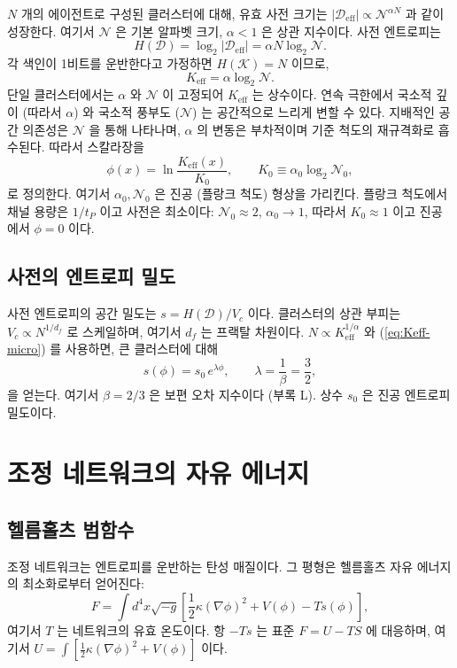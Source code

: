 \documentclass[12pt,a4paper]{article}
\newcommand{\Dir}{\mathcal{D}}
\begin{document}
	\(N\) 개의 에이전트로 구성된 클러스터에 대해, 유효 사전 크기는 \(|\Dir_{\mathrm{eff}}| \propto \mathcal{N}^{\alpha N}\) 과 같이 성장한다. 여기서 \(\mathcal{N}\) 은 기본 알파벳 크기, \(\alpha<1\) 은 상관 지수이다. 사전 엔트로피는
	\[
	H(\Dir) = \log_2 |\Dir_{\mathrm{eff}}| = \alpha N \log_2 \mathcal{N}.
	\]
	각 색인이 1비트를 운반한다고 가정하면 \(H(\mathcal{K}) = N\) 이므로,
	\begin{equation}
		K_{\mathrm{eff}} = \alpha \log_2 \mathcal{N}. \label{eq:Keff-micro}
	\end{equation}
	단일 클러스터에서는 \(\alpha\) 와 \(\mathcal{N}\) 이 고정되어 \(K_{\mathrm{eff}}\) 는 상수이다. 연속 극한에서 국소적 깊이 (따라서 \(\alpha\)) 와 국소적 풍부도 (\(\mathcal{N}\)) 는 공간적으로 느리게 변할 수 있다. 지배적인 공간 의존성은 \(\mathcal{N}\) 을 통해 나타나며, \(\alpha\) 의 변동은 부차적이며 기준 척도의 재규격화로 흡수된다. 따라서 스칼라장을
	\begin{equation}
		\phi(x) = \ln \frac{K_{\mathrm{eff}}(x)}{K_0}, \qquad K_0 \equiv \alpha_0 \log_2 \mathcal{N}_0,
		\label{eq:phi-def}
	\end{equation}
	로 정의한다. 여기서 \(\alpha_0,\mathcal{N}_0\) 은 진공 (플랑크 척도) 형상을 가리킨다. 플랑크 척도에서 채널 용량은 \(1/t_P\) 이고 사전은 최소이다: \(\mathcal{N}_0 \approx 2\), \(\alpha_0 \rightarrow 1\), 따라서 \(K_0 \approx 1\) 이고 진공에서 \(\phi=0\) 이다.
	
	\subsection{사전의 엔트로피 밀도}
	사전 엔트로피의 공간 밀도는 \(s = H(\Dir)/V_c\) 이다. 클러스터의 상관 부피는 \(V_c \propto N^{1/d_f}\) 로 스케일하며, 여기서 \(d_f\) 는 프랙탈 차원이다. \(N \propto K_{\mathrm{eff}}^{1/\alpha}\) 와 (\ref{eq:Keff-micro}) 를 사용하면, 큰 클러스터에 대해
	\begin{equation}
		s(\phi) = s_0\, e^{\lambda\phi}, \qquad \lambda = \frac{1}{\beta} = \frac{3}{2},
		\label{eq:s-phi}
	\end{equation}
	을 얻는다. 여기서 \(\beta = 2/3\) 은 보편 오차 지수이다 (부록 L). 상수 \(s_0\) 은 진공 엔트로피 밀도이다.
	
	\section{조정 네트워크의 자유 에너지}
	
	\subsection{헬름홀츠 범함수}
	조정 네트워크는 엔트로피를 운반하는 탄성 매질이다. 그 평형은 헬름홀츠 자유 에너지의 최소화로부터 얻어진다:
	\begin{equation}
		F = \int d^4x \sqrt{-g} \left[ \frac{1}{2}\kappa (\nabla\phi)^2 + V(\phi) - T s(\phi) \right],
		\label{eq:F}
	\end{equation}
	여기서 \(T\) 는 네트워크의 유효 온도이다. 항 \(-Ts\) 는 표준 \(F = U - TS\) 에 대응하며, 여기서 \(U = \int [\frac12\kappa(\nabla\phi)^2 + V(\phi)]\) 이다.
	
\end{document}
